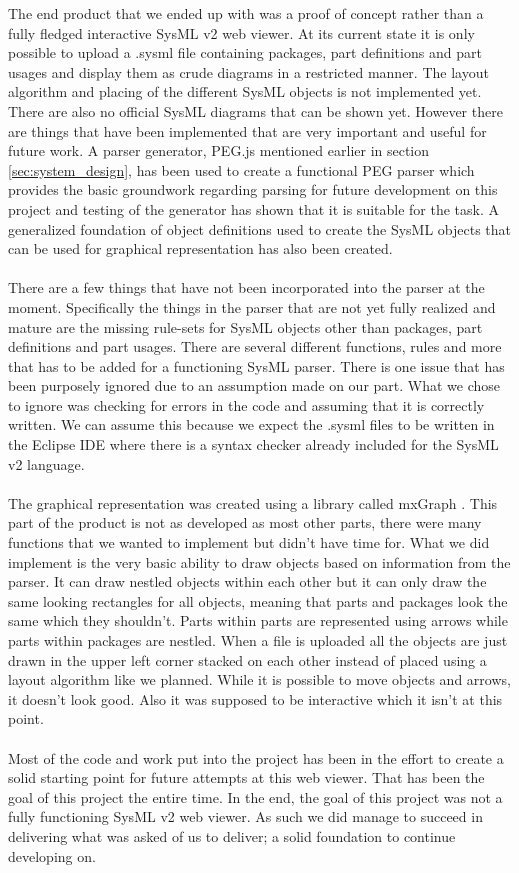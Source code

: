 \documentclass{article}
\begin{document}
The end product that we ended up with was a proof of concept rather than a fully fledged interactive SysML v2 web viewer. At its current state it is only possible to upload a .sysml file containing packages, part definitions and part usages and display them as crude diagrams in a restricted manner. The layout algorithm and placing of the different SysML objects is not implemented yet. There are also no official SysML diagrams that can be shown yet. However there are things that have been implemented that are very important and useful for future work. A parser generator, PEG.js mentioned earlier in section \ref{sec:system_design}, has been used to create a functional PEG parser which provides the basic groundwork regarding parsing for future development on this project and testing of the generator has shown that it is suitable for the task. A generalized foundation of object definitions used to create the SysML objects that can be used for graphical representation has also been created. 
\\\\
There are a few things that have not been incorporated into the parser at the moment. Specifically the things in the parser that are not yet fully realized and mature are the missing rule-sets for SysML objects other than packages, part definitions and part usages. There are several different functions, rules and more that has to be added for a functioning SysML parser. There is one issue that has been purposely ignored due to an assumption made on our part. What we chose to ignore was checking for errors in the code and assuming that it is correctly written. We can assume this because we expect the .sysml files to be written in the Eclipse IDE \cite{eclipseIDE} where there is a syntax checker already included for the SysML v2 language. 
\\\\
The graphical representation was created using a library called mxGraph \cite{mxGraph}. This part of the product is not as developed as most other parts, there were many functions that we wanted to implement but didn't have time for. What we did implement is the very basic ability to draw objects based on information from the parser. It can draw nestled objects within each other but it can only draw the same looking rectangles for all objects, meaning that parts and packages look the same which they shouldn't. Parts within parts are represented using arrows while parts within packages are nestled. When a file is uploaded all the objects are just drawn in the upper left corner stacked on each other instead of placed using a layout algorithm like we planned. While it is possible to move objects and arrows, it doesn't look good. Also it was supposed to be interactive which it isn't at this point. 
\\\\
Most of the code and work put into the project has been in the effort to create a solid starting point for future attempts at this web viewer. That has been the goal of this project the entire time. In the end, the goal of this project was not a fully functioning SysML v2 web viewer. As such we did manage to succeed in delivering what was asked of us to deliver; a solid foundation to continue developing on. 
\end{document}
